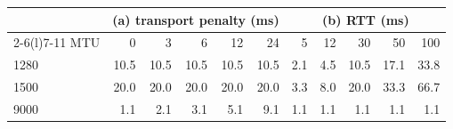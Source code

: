 \begin{tabular}{@{}lrrrrr@{\hspace{14pt}}rrrrr@{}}
\toprule
& \multicolumn{5}{c}{(a) transport penalty (ms)} & \multicolumn{5}{c}{(b) RTT (ms)} \\
\cmidrule(r){2-6}\cmidrule(l){7-11}
MTU & 0 & 3 & 6 & 12 & 24 & 5 & 12 & 30 & 50 & 100 \\
\midrule
1280 & 10.5 & 10.5 & 10.5 & 10.5 & 10.5 & 2.1 & 4.5 & 10.5 & 17.1 & 33.8 \\
1500 & 20.0 & 20.0 & 20.0 & 20.0 & 20.0 & 3.3 & 8.0 & 20.0 & 33.3 & 66.7 \\
9000 & 1.1 & 2.1 & 3.1 & 5.1 & 9.1 & 1.1 & 1.1 & 1.1 & 1.1 & 1.1 \\
\bottomrule
\end{tabular}

